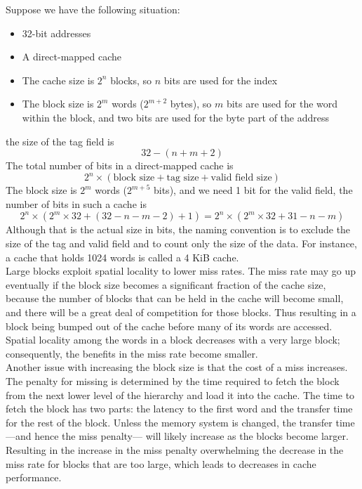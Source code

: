 \documentclass[12pt]{article}
\theoremstyle{definition}
\begin{document}
  Suppose we have the following situation:
  \begin{itemize}
    \item 32-bit addresses
    \item A direct-mapped cache
    \item The cache size is $2^{n}$ blocks, so $n$ bits are used for the index
    \item The block size is $2^{m}$ words ($2^{m+2}$ bytes), so $m$ bits are used for the word within the block, and two bits are used for the byte part of the address
  \end{itemize}
  the size of the tag field is
  $$32 - (n + m + 2)$$
  The total number of bits in a direct-mapped cache is
  $$2^{n} \times (\text{block size} + \text{tag size} + \text{valid field size})$$
  The block size is $2^{m}$ words ($2^{m+5}$ bits), and we need 1 bit for the valid field, the number of bits in such a cache is
  $$2^{n} \times (2^{m} \times 32 + (32 - n - m - 2) + 1) = 2^{n} \times (2^{m} \times 32 + 31 - n -m)$$
  Although that is the actual size in bits, the naming convention is to exclude the size of the tag and valid field and to count only the size of the data.
  For instance, a cache that holds 1024 words is called a 4 KiB cache. \\

  Large blocks exploit spatial locality to lower miss rates.
  The miss rate may go up eventually if the block size becomes a significant fraction of the cache size, because the number of blocks that can be held in the cache will become small, and there will be a great deal of competition for those blocks.
  Thus resulting in a block being bumped out of the cache before many of its words are accessed.
  Spatial locality among the words in a block decreases with a very large block; consequently, the benefits in the miss rate become smaller. \\

  Another issue with increasing the block size is that the cost of a miss increases.
  The penalty for missing is determined by the time required to fetch the block from the next lower level of the hierarchy and load it into the cache.
  The time to fetch the block has two parts: the latency to the first word and the transfer time for the rest of the block.
  Unless the memory system is changed, the transfer time---and hence the miss penalty--- will likely increase as the blocks become larger.
  Resulting in the increase in the miss penalty overwhelming the decrease in the miss rate for blocks that are too large, which leads to decreases in cache performance.
\end{document}
